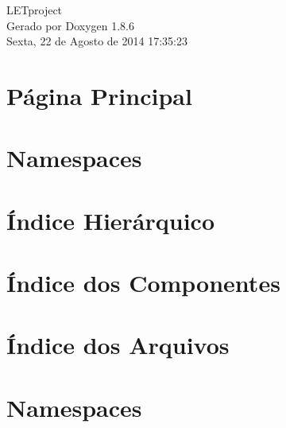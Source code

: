 \documentclass[twoside]{article}
\begin{document}
\hypersetup{pageanchor=false}
\begin{titlepage}
\vspace*{7cm}
\begin{center}%
{\Large L\-E\-Tproject }\\
\vspace*{1cm}
{\large Gerado por Doxygen 1.8.6}\\
\vspace*{0.5cm}
{\small Sexta, 22 de Agosto de 2014 17:35:23}\\
\end{center}
\end{titlepage}
\tableofcontents
{}
\hypersetup{pageanchor=true}

\section{Página Principal}
\label{index}\hypertarget{index}{}
\section{Namespaces}

\section{Índice Hierárquico}

\section{Índice dos Componentes}

\section{Índice dos Arquivos}

\section{Namespaces}

































\end{document}
